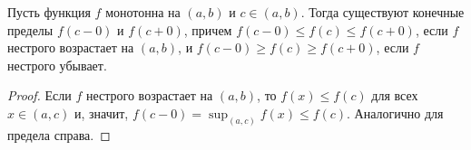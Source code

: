     \begin{corollary}
        Пусть функция $f$ монотонна на $(a, b)$ и $c \in (a, b)$. Тогда существуют конечные пределы $f(c - 0)$ и $f(c + 0)$, причем $f(c - 0) \leq f(c) \leq f(c + 0)$, если $f$ нестрого возрастает на $(a, b)$, и $f(c - 0) \geq f(c) \geq f(c + 0)$, если $f$ нестрого убывает.
    \end{corollary}

    \begin{proof}
        Если $f$ нестрого возрастает на $(a, b)$, то $f(x) \leq f(c)$ для всех $x \in (a, c)$ и, значит, $f(c - 0) = \sup_{(a, c)}f(x) \leq f(c)$. Аналогично для предела справа.
    \end{proof}